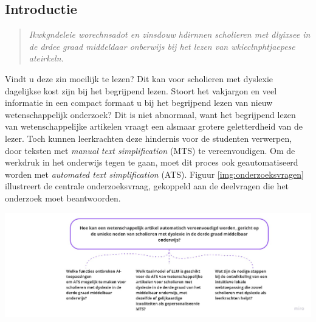 \documentclass[a0,portrait]{hogent-poster}
\begin{document}
\begin{multicols}{2} %

\section{Introductie}




\begin{quotation}
\textit{Ikwkgndeleie worechnsadot en zinsdouw hdirnnen scholieren met dlyixsee in de drdee graad middeldaar onberwijs bij het lezen van wkieclnphtjaepese ateirkeln.}
\end{quotation}

Vindt u deze zin moeilijk te lezen? Dit kan voor scholieren met dyslexie dagelijkse kost zijn bij het begrijpend lezen. Stoort het vakjargon en veel informatie in een compact formaat u bij het begrijpend lezen van nieuw wetenschappelijk onderzoek? Dit is niet abnormaal, want het begrijpend lezen van wetenschappelijke artikelen vraagt een alsmaar grotere geletterdheid van de lezer. Toch kunnen leerkrachten deze hindernis voor de studenten verwerpen, door teksten met \textit{manual text simplification} (MTS) te vereenvoudigen. Om de werkdruk in het onderwijs tegen te gaan, moet dit proces ook geautomatiseerd worden met \textit{automated text simplification} (ATS). Figuur \ref{img:onderzoeksvragen} illustreert de centrale onderzoeksvraag, gekoppeld aan de deelvragen die het onderzoek moet beantwoorden.


\begin{center}
	\captionsetup{type=figure}
	\includegraphics[width=1.0\linewidth]{figures/onderzoeksvragen.jpg}
	\label{img:onderzoeksvragen}
\end{center}


\end{multicols}
\end{document}
